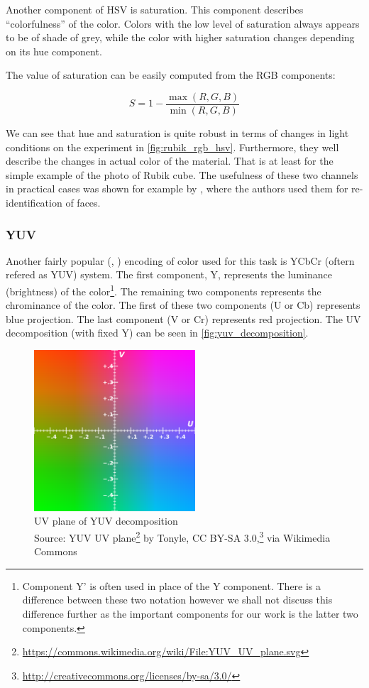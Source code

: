 Another component of HSV is saturation. This component describes
``colorfulness'' of the color. Colors with the low level of saturation always
appears to be of shade of grey, while the color with higher saturation changes
depending on its hue component.

The value of saturation can be easily computed from the RGB components:

$$S = 1 - \frac{\max(R,G,B)}{\min(R,G,B)}$$

We can see that hue and saturation is quite robust
in terms of changes in light conditions on the experiment in
\autoref{fig:rubik_rgb_hsv}. Furthermore, they well describe the
changes in actual color of the material. That is at least for the simple
example of the photo of Rubik cube. The usefulness of these two channels
in practical cases was shown for example by \cite{mckenna1997tracking}, where
the authors used them for re-identification of faces.

\subsubsection{YUV}

Another fairly popular (\cite{orwell1999multi}, \cite{wren1997pfinder}) encoding
of color used for this task is YCbCr (oftern refered as YUV) system.
The first component, Y, represents the luminance (brightness) of the
color\footnote{Component Y' is often used in place of the Y component.
There is a difference between these two notation however we shall not discuss
this difference further as the important components for our work is the
latter two components.}. The remaining two components represents the chrominance
of the color. The first of these two components (U or Cb) represents blue
projection. The last component (V or Cr) represents red projection. The
UV decomposition (with fixed Y) can be seen in \autoref{fig:yuv_decomposition}.

\begin{figure}
    \centering
    \includegraphics[width=6cm]{img/YUV_UV_plane.svg.png}
    \caption[UV plane of YUV decomposition]{UV plane of YUV decomposition\\
    Source: YUV UV plane\footnote{\url{https://commons.wikimedia.org/wiki/File:YUV_UV_plane.svg}} by Tonyle, CC BY-SA 3.0,\footnote{\url{http://creativecommons.org/licenses/by-sa/3.0/}} via Wikimedia Commons}
    \label{fig:yuv_decomposition}
\end{figure}

